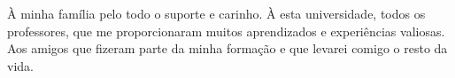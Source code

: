 À minha família pelo todo o suporte e carinho.
À esta universidade, todos os professores, que me proporcionaram muitos aprendizados e experiências valiosas.
Aos amigos que fizeram parte da minha formação e que levarei comigo o resto da vida.